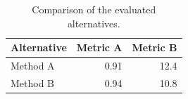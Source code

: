 \begin{table}[htbp]
  \centering
  \caption{Comparison of the evaluated alternatives.}
  \label{tab:comparison}
  \begin{tabular}{lrr}
    \toprule
    Alternative & Metric A & Metric B \\
    \midrule
    Method A & 0.91 & 12.4 \\
    Method B & 0.94 & 10.8 \\
    \bottomrule
  \end{tabular}
\end{table}
